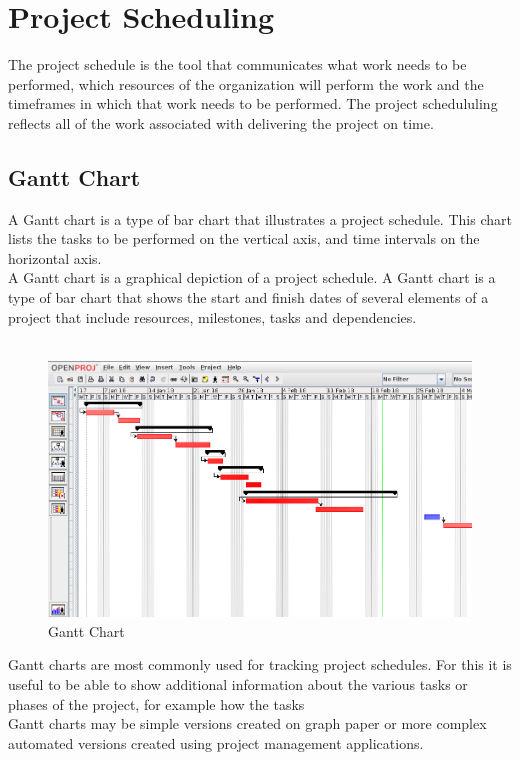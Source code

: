 \section{Project Scheduling}
The project schedule is the tool that communicates what work needs to be performed, which resources of the organization will perform the work and the timeframes in which that work needs to be performed. The project schedululing reflects all of the work associated with delivering the project on time.

\subsection{Gantt Chart}
A Gantt chart is a type of bar chart that illustrates a project schedule. This chart lists the tasks to be performed on the vertical axis, and time intervals on the horizontal axis.\\
A Gantt chart is a graphical depiction of a project schedule. A Gantt chart is a type of bar chart that shows the start and finish dates of several elements of a project that include resources, milestones, tasks and dependencies. \\\\

 \begin{figure}[!h]
	\centering \includegraphics[scale=.43]{input/images/chart1.png}
	\caption{Gantt Chart}
\end{figure}

Gantt charts are most commonly used for tracking project schedules. For this it is useful to be able to show additional information about the various tasks or phases of the project, for example how the tasks \\
Gantt charts may be simple versions created on graph paper or more complex automated versions created using project management applications.
\newpage
